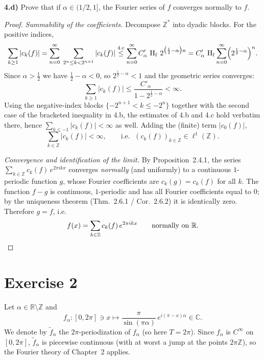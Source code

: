 \documentclass[11pt]{article}
\newcommand{\R}{\mathbb{R}}
\newcommand{\C}{\mathbb{C}}
\newcommand{\Z}{\mathbb{Z}}
\newcommand{\abs}[1]{\left\lvert #1 \right\rvert}
\DeclareMathOperator{\Hf}{H_f}
\newcommand{\ck}[1]{c_{#1}}
\begin{document}
\bigskip
\noindent\textbf{4.d)} Prove that if $\alpha\in(1/2,1]$, the Fourier series of $f$ converges normally
to $f$.

\begin{proof}
\emph{Summability of the coefficients.} Decompose $\Z^{*}$ into dyadic blocks. For the positive
indices,
\[
\sum_{k\ge1}\abs{\ck{k}(f)}
=\sum_{n=0}^{\infty}\;\sum_{2^{n}\le k<2^{n+1}}\abs{\ck{k}(f)}
\overset{\text{4.c}}{\le}\sum_{n=0}^{\infty}C'_\alpha\,\Hf\,2^{\bigl(\frac12-\alpha\bigr)n}
=C'_\alpha\,\Hf\sum_{n=0}^{\infty}\Bigl(2^{\frac12-\alpha}\Bigr)^{n}.
\]
Since $\alpha>\tfrac12$ we have $\tfrac12-\alpha<0$, so $2^{\frac12-\alpha}<1$ and the geometric
series converges:
\[
\sum_{k\ge1}\abs{\ck{k}(f)}\le \frac{C'_\alpha\,\Hf}{1-2^{\frac12-\alpha}}<\infty .
\]
Using the negative-index blocks $\{-2^{n+1}<k\le-2^{n}\}$ together with the second case of the
bracketed inequality in 4.b, the estimates of 4.b and 4.c hold verbatim there, hence
$\sum_{k\le-1}\abs{\ck{k}(f)}<\infty$ as well. Adding the (finite) term $\abs{\ck{0}(f)}$,
\[
\sum_{k\in\Z}\abs{\ck{k}(f)}<\infty,\qquad\text{i.e. }\;(\ck{k}(f))_{k\in\Z}\in\ell^1(\Z).
\]

\emph{Convergence and identification of the limit.} By Proposition~2.4.1, the series
$\sum_{k\in\Z}\ck{k}(f)\,e^{2\pi i k x}$ converges \emph{normally} (and uniformly) to a continuous
$1$-periodic function $g$, whose Fourier coefficients are $\ck{k}(g)=\ck{k}(f)$ for all $k$.
The function $f-g$ is continuous, $1$-periodic and has all Fourier coefficients equal to $0$; by the
uniqueness theorem (Thm.~2.6.1 / Cor.~2.6.2) it is identically zero. Therefore $g=f$, i.e.
\[
f(x)=\sum_{k\in\Z}\ck{k}(f)\,e^{2\pi i k x}\qquad\text{normally on }\R. \qedhere
\]
\end{proof}

\section*{Exercise 2}

Let $\alpha\in\R\setminus\Z$ and
\[
f_\alpha:[0,2\pi]\ni x\longmapsto \frac{\pi}{\sin(\pi\alpha)}\,e^{i(\pi-x)\alpha}\in\C .
\]
We denote by $\tilde f_\alpha$ the $2\pi$-periodization of $f_\alpha$ (so here $T=2\pi$). Since
$f_\alpha$ is $C^\infty$ on $[0,2\pi]$, $\tilde f_\alpha$ is piecewise continuous (with at worst a jump
at the points $2\pi\Z$), so the Fourier theory of Chapter~2 applies.
\end{document}
